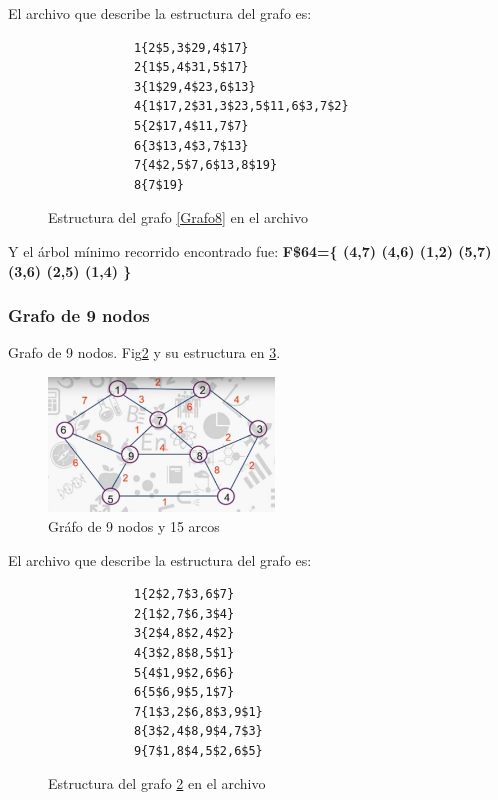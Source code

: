         El archivo que describe la estructura del grafo es:
        \begin{figure}[h!]
            \centering
            \begin{verbatim}
            1{2$5,3$29,4$17}
            2{1$5,4$31,5$17}
            3{1$29,4$23,6$13}
            4{1$17,2$31,3$23,5$11,6$3,7$2}
            5{2$17,4$11,7$7}
            6{3$13,4$3,7$13}
            7{4$2,5$7,6$13,8$19}
            8{7$19}\end{verbatim}
            \caption{Estructura del grafo \ref{Grafo8} en el archivo}
            \label{ArchivoGrafo8}
        \end{figure} 
        
        Y el árbol mínimo recorrido encontrado fue: \textbf{F\$64=\{ (4,7)  (4,6)  (1,2)  (5,7)  (3,6)  (2,5)  (1,4) \}}

    \newpage

        \subsubsection*{Grafo de 9 nodos}
        Grafo de 9 nodos. Fig\ref{Grafo9} y su estructura en \ref{ArchivoGrafo9}.
        
        \begin{figure}[h!]
            \centering
            \includegraphics[width=6cm]{Kruskal/Grafo9.png}
            \caption{Gráfo de 9 nodos y 15 arcos}
            \label{Grafo9}
        \end{figure}
            
        El archivo que describe la estructura del grafo es:
        \begin{figure}[h!]
            \centering
            \begin{verbatim}
            1{2$2,7$3,6$7}
            2{1$2,7$6,3$4}
            3{2$4,8$2,4$2}
            4{3$2,8$8,5$1}
            5{4$1,9$2,6$6}
            6{5$6,9$5,1$7}
            7{1$3,2$6,8$3,9$1}
            8{3$2,4$8,9$4,7$3}
            9{7$1,8$4,5$2,6$5}\end{verbatim}
            \caption{Estructura del grafo \ref{Grafo9} en el archivo}
            \label{ArchivoGrafo9}
        \end{figure} 
        
